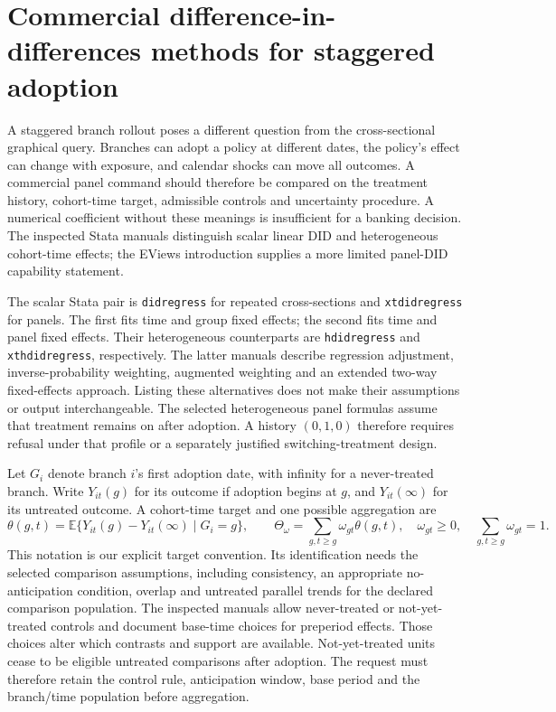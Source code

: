 \section{Commercial difference-in-differences methods for staggered adoption}
\label{exec18:gp-panel}

A staggered branch rollout poses a different question from the cross-sectional
graphical query. Branches can adopt a policy at different dates, the policy's
effect can change with exposure, and calendar shocks can move all outcomes.
A commercial panel command should therefore be compared on the treatment
history, cohort-time target, admissible controls and uncertainty procedure.
A numerical coefficient without these meanings is insufficient for a banking
decision. The inspected Stata manuals distinguish scalar linear DID and
heterogeneous cohort-time effects; the EViews introduction supplies a more
limited panel-DID capability statement.
\citep{exec18_gp_stata_did,exec18_gp_stata_hdid,exec18_gp_stata_xthdid,exec18_gp_eviews}

The scalar Stata pair is \texttt{didregress} for repeated cross-sections and
\texttt{xtdidregress} for panels. The first fits time and group fixed effects;
the second fits time and panel fixed effects. Their heterogeneous counterparts
are \texttt{hdidregress} and \texttt{xthdidregress}, respectively. The latter
manuals describe regression adjustment, inverse-probability weighting,
augmented weighting and an extended two-way fixed-effects approach. Listing
these alternatives does not make their assumptions or output interchangeable.
The selected heterogeneous panel formulas assume that treatment remains on
after adoption. A history \((0,1,0)\) therefore requires refusal under that
profile or a separately justified switching-treatment design.
\citep{exec18_gp_stata_did,exec18_gp_stata_hdid,exec18_gp_stata_xthdid}

Let \(G_i\) denote branch \(i\)'s first adoption date, with infinity for a
never-treated branch. Write \(Y_{it}(g)\) for its outcome if adoption begins
at \(g\), and \(Y_{it}(\infty)\) for its untreated outcome. A cohort-time
target and one possible aggregation are
\begin{equation}
\label{exec18:gp-cohort-target}
 \theta(g,t)=\mathbb E\{Y_{it}(g)-Y_{it}(\infty)\mid G_i=g\},
 \qquad \Theta_{\omega}=\sum_{g,t\geq g}\omega_{gt}\theta(g,t),
 \quad \omega_{gt}\geq0,\quad\sum_{g,t\geq g}\omega_{gt}=1.
\end{equation}
This notation is our explicit target convention. Its identification needs
the selected comparison assumptions, including consistency, an appropriate
no-anticipation condition, overlap and untreated parallel trends for the
declared comparison population. The inspected manuals allow never-treated
or not-yet-treated controls and document base-time choices for preperiod
effects. Those choices alter which contrasts and support are available.
Not-yet-treated units cease to be eligible untreated comparisons after
adoption. The request must therefore retain the control rule, anticipation
window, base period and the branch/time population before aggregation.
\citep{exec18_gp_stata_hdid,exec18_gp_stata_xthdid}

